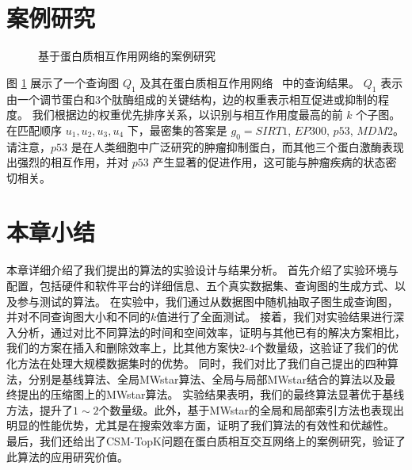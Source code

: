\section{案例研究}
\begin{figure}[h!]
    \centering
    \caption{基于蛋白质相互作用网络的案例研究}
    \label{fig:human-caseStudy}
    \end{figure}    
图 \ref{fig:human-caseStudy} 展示了一个查询图 $Q_1$ 及其在蛋白质相互作用网络~\cite{dat-protein} 中的查询结果。
    $Q_1$ 表示由一个调节蛋白和3个肽酶组成的关键结构，边的权重表示相互促进或抑制的程度。
    我们根据边的权重优先排序关系，以识别与相互作用度最高的前 $k$ 个子图。
    在匹配顺序 ${u_1, u_2, u_3, u_4}$ 下，最密集的答案是 $g_0=${$SIRT1$, $EP300$, $p53$, $MDM2$}。
    请注意，$p53$ 是在人类细胞中广泛研究的肿瘤抑制蛋白，而其他三个蛋白激酶表现出强烈的相互作用，并对 $p53$ 产生显著的促进作用，这可能与肿瘤疾病的状态密切相关。
\section{本章小结}
本章详细介绍了我们提出的算法的实验设计与结果分析。
首先介绍了实验环境与配置，包括硬件和软件平台的详细信息、五个真实数据集、查询图的生成方式、以及参与测试的算法。
在实验中，我们通过从数据图中随机抽取子图生成查询图，并对不同查询图大小和不同的$k$值进行了全面测试。
接着，我们对实验结果进行深入分析，通过对比不同算法的时间和空间效率，证明与其他已有的解决方案相比，我们的方案在插入和删除效率上，比其他方案快2-4个数量级，这验证了我们的优化方法在处理大规模数据集时的优势。
同时，我们对比了我们自己提出的四种算法，分别是基线算法、全局MWstar算法、全局与局部MWstar结合的算法以及最终提出的压缩图上的MWstar算法。
实验结果表明，我们的最终算法显著优于基线方法，提升了$1\sim2$个数量级。此外，基于MWstar的全局和局部索引方法也表现出明显的性能优势，尤其是在搜索效率方面，证明了我们算法的有效性和优越性。
最后，我们还给出了CSM-TopK问题在蛋白质相互交互网络上的案例研究，验证了此算法的应用研究价值。